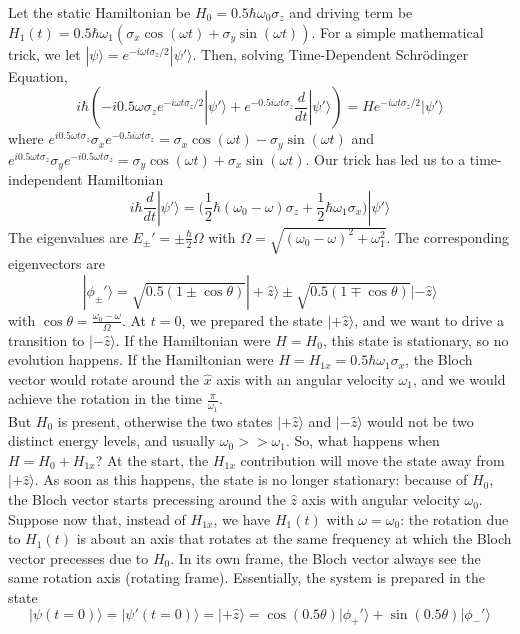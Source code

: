 \documentclass[a4paper]{article}
\begin{document}
\begin{eg}
Let the static Hamiltonian be $H_0=0.5\hbar\omega_0\sigma_z$ and driving term be $H_1(t)=0.5\hbar\omega_1(\sigma_x\cos(\omega t)+\sigma_y\sin(\omega t))$. For a simple mathematical trick, we let $|\psi\rangle=e^{-i\omega t\sigma_z/2}|\psi'\rangle$. Then, solving Time-Dependent Schr\"{o}dinger Equation,
$$i\hbar(-i0.5\omega\sigma_ze^{-i\omega t\sigma_z/2}|\psi'\rangle+e^{-0.5i\omega t\sigma_z}\frac{d}{dt}|\psi'\rangle)=He^{-i\omega t\sigma_z/2}|\psi'\rangle$$
where $e^{i0.5\omega t\sigma_z}\sigma_xe^{-0.5i\omega t\sigma_z}=\sigma_x\cos(\omega t)-\sigma_y\sin(\omega t)$ and $e^{i0.5\omega t\sigma_z}\sigma_ye^{-i0.5\omega t\sigma_z}=\sigma_y\cos(\omega t)+\sigma_x\sin(\omega t)$. Our trick has led us to a time-independent Hamiltonian
$$i\hbar\frac{d}{dt}|\psi'\rangle=\bigg(\frac{1}{2}\hbar(\omega_0-\omega)\sigma_z+\frac{1}{2}\hbar\omega_1\sigma_x\bigg)|\psi'\rangle$$
The eigenvalues are $E_{\pm}'=\pm\frac{\hbar}{2}\Omega$ with $\Omega=\sqrt{(\omega_0-\omega)^2+\omega_1^2}$. The corresponding eigenvectors are
$$|\phi_{\pm}'\rangle=\sqrt{0.5(1\pm\cos\theta)}|+\hat{z}\rangle\pm\sqrt{0.5(1\mp\cos\theta)}|-\hat{z}\rangle$$
with $\cos\theta=\frac{\omega_0-\omega}{\Omega}$. At $t=0$, we prepared the state $|+\hat{z}\rangle$, and we want to drive a transition to $|-\hat{z}\rangle$. If the Hamiltonian were $H=H_0$, this state is stationary, so no evolution happens. If the Hamiltonian were $H=H_{1x}=0.5\hbar\omega_1\sigma_x$, the Bloch vector would rotate around the $\hat{x}$ axis with an angular velocity $\omega_1$, and we would achieve the rotation in the time $\frac{\pi}{\omega_1}$.\\[5pt]
But $H_0$ is present, otherwise the two states $|+\hat{z}\rangle$ and $|-\hat{z}\rangle$ would not be two distinct energy levels, and usually $\omega_0>>\omega_1$. So, what happens when $H=H_0+H_{1x}$? At the start, the $H_{1x}$ contribution will move the state away from $|+\hat{z}\rangle$. As soon as this happens, the state is no longer stationary: because of $H_0$, the Bloch vector starts precessing around the $\hat{z}$ axis with angular velocity $\omega_0$. \\[5pt]
Suppose now that, instead of $H_{1x}$, we have $H_1(t)$ with $\omega=\omega_0$: the rotation due to $H_1(t)$ is about an axis that rotates at the same frequency at which the Bloch vector precesses due to $H_0$. In its own frame, the Bloch vector always see the same rotation axis (rotating frame). Essentially, the system is prepared in the state
$$|\psi(t=0)\rangle=|\psi'(t=0)\rangle=|+\hat{z}\rangle=\cos(0.5\theta)|\phi_+'\rangle+\sin(0.5\theta)|\phi_-'\rangle$$

\end{eg}
\end{document}
